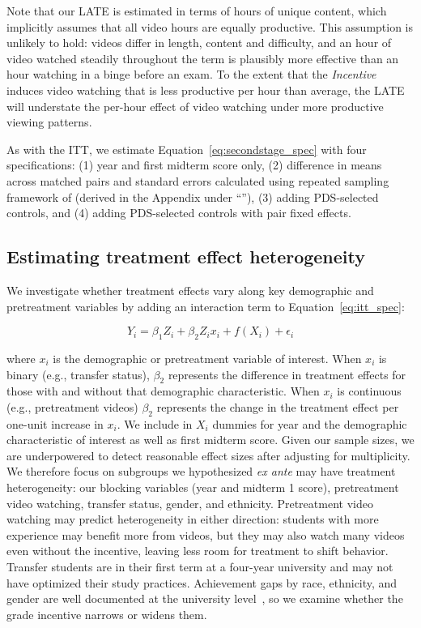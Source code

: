 Note that our LATE is estimated in terms of hours of unique content, which implicitly assumes that all video hours are equally productive.
This assumption is unlikely to hold: videos differ in length, content and difficulty, and an hour of video watched steadily throughout the term is plausibly more effective than an hour watching in a binge before an exam.
To the extent that the \textit{Incentive} induces video watching that is less productive per hour than average, the LATE will understate the per-hour effect of video watching under more productive viewing patterns.

As with the ITT, we estimate Equation~\ref{eq:secondstage_spec} with four specifications: (1) year and first midterm score only, (2) difference in means across matched pairs and standard errors calculated using repeated sampling framework of \textcite{neyman1923} (derived in the Appendix under ``''), (3) adding PDS-selected controls, and (4) adding PDS-selected controls with pair fixed effects.

\subsection{Estimating treatment effect heterogeneity}

We investigate whether treatment effects vary along key demographic and pretreatment variables by adding an interaction term to Equation~\ref{eq:itt_spec}:

\begin{equation} \label{eq:het_spec}
	Y_i = \beta_1 Z_i + \beta_2 Z_i x_i + f(X_i) + \epsilon_i
\end{equation}

where $x_i$ is the demographic or pretreatment variable of interest.
When $x_i$ is binary (e.g., transfer status), $\beta_2$ represents the difference in treatment effects for those with and without that demographic characteristic.
When $x_i$ is continuous (e.g., pretreatment videos) $\beta_2$ represents the change in the treatment effect per one-unit increase in $x_i$.
We include in $X_i$ dummies for year and the demographic characteristic of interest as well as first midterm score.
Given our sample sizes, we are underpowered to detect reasonable effect sizes after adjusting for multiplicity.
We therefore focus on subgroups we hypothesized \textit{ex ante} may have treatment heterogeneity: our blocking variables (year and midterm 1 score), pretreatment video watching, transfer status, gender, and ethnicity.
Pretreatment video watching may predict heterogeneity in either direction: students with more experience may benefit more from videos, but they may also watch many videos even without the incentive, leaving less room for treatment to shift behavior.
Transfer students are in their first term at a four-year university and may not have optimized their study practices.
Achievement gaps by race, ethnicity, and gender are well documented at the university level~\parencite{bcm2009}, so we examine whether the grade incentive narrows or widens them.

